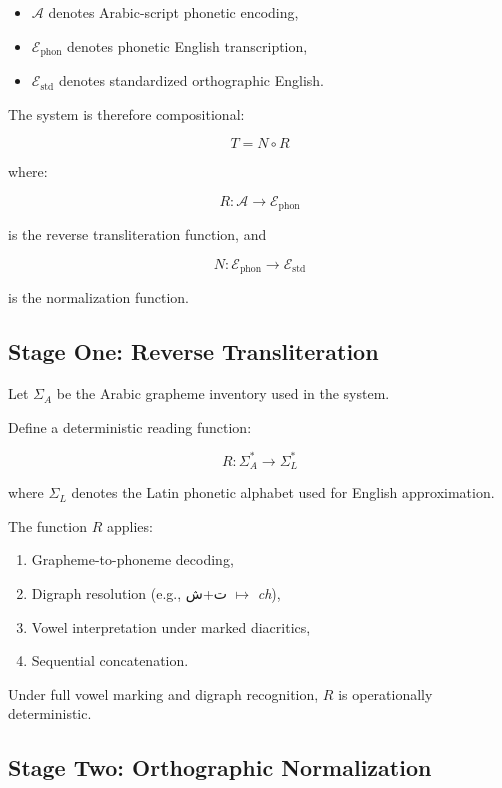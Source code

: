 \documentclass[12pt]{article}
\newcommand{\AR}[1]{\foreignlanguage{arabic}{#1}}
\begin{document}
\begin{itemize}
\item $\mathcal{A}$ denotes Arabic-script phonetic encoding,
\item $\mathcal{E}_{\text{phon}}$ denotes phonetic English transcription,
\item $\mathcal{E}_{\text{std}}$ denotes standardized orthographic English.
\end{itemize}

The system is therefore compositional:

\[
T = N \circ R
\]

where:

\[
R : \mathcal{A} \rightarrow \mathcal{E}_{\text{phon}}
\]

is the reverse transliteration function, and

\[
N : \mathcal{E}_{\text{phon}} \rightarrow \mathcal{E}_{\text{std}}
\]

is the normalization function.

\subsection{Stage One: Reverse Transliteration}

Let $\Sigma_A$ be the Arabic grapheme inventory used in the system.

Define a deterministic reading function:

\[
R : \Sigma_A^\ast \rightarrow \Sigma_{L}^\ast
\]

where $\Sigma_{L}$ denotes the Latin phonetic alphabet used for English approximation.

The function $R$ applies:

\begin{enumerate}
\item Grapheme-to-phoneme decoding,
\item Digraph resolution (e.g., \AR{ت}+\AR{ش} $\mapsto$ \textit{ch}),
\item Vowel interpretation under marked diacritics,
\item Sequential concatenation.
\end{enumerate}

Under full vowel marking and digraph recognition, $R$ is operationally deterministic.

\subsection{Stage Two: Orthographic Normalization}
\end{document}

